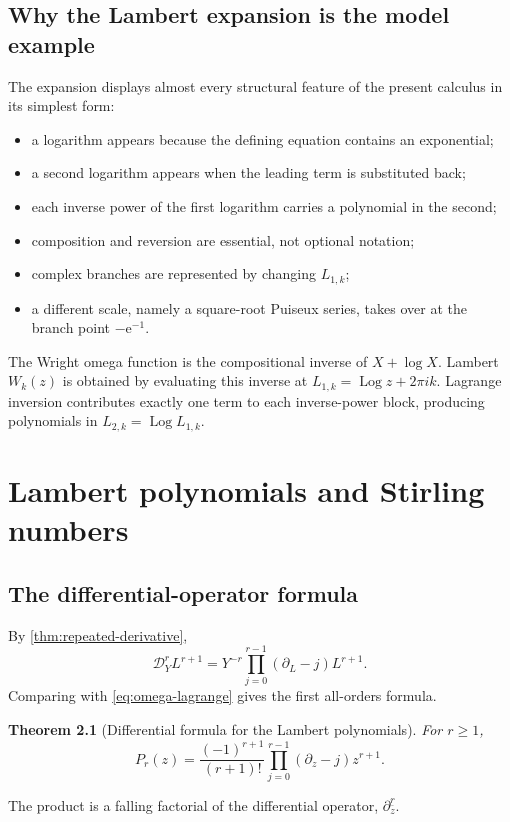 \documentclass[11pt,oneside]{book}
\newtheorem{theorem}{Theorem}[chapter]
\theoremstyle{definition}
\theoremstyle{remark}
\DeclareMathOperator{\Log}{Log}
\newcommand{\e}{\mathrm e}
\newcommand{\D}{\mathcal D}
\begin{document}
\section{Why the Lambert expansion is the model example}
The expansion displays almost every structural feature of the present
calculus in its simplest form:
\begin{itemize}
\item a logarithm appears because the defining equation contains an
      exponential;
\item a second logarithm appears when the leading term is substituted back;
\item each inverse power of the first logarithm carries a polynomial in the
      second;
\item composition and reversion are essential, not optional notation;
\item complex branches are represented by changing $L_{1,k}$;
\item a different scale, namely a square-root Puiseux series, takes over at
      the branch point $-\e^{-1}$.
\end{itemize}

\begin{summarybox}
The Wright omega function is the compositional inverse of $X+\log X$.
Lambert $W_k(z)$ is obtained by evaluating this inverse at
$L_{1,k}=\Log z+2\pi i k$.  Lagrange inversion contributes exactly one term
to each inverse-power block, producing polynomials in
$L_{2,k}=\Log L_{1,k}$.
\end{summarybox}


\chapter{Lambert polynomials and Stirling numbers}
\label{ch:lambert-polynomials}

\section{The differential-operator formula}
By \cref{thm:repeated-derivative},
\[
 \D_Y^r L^{r+1}
 =Y^{-r}\prod_{j=0}^{r-1}(\partial_L-j)L^{r+1}.
\]
Comparing with \eqref{eq:omega-lagrange} gives the first all-orders formula.

\begin{theorem}[Differential formula for the Lambert polynomials]
\label{thm:P-differential}
For $r\ge1$,
\begin{equation}\label{eq:P-differential}
 P_r(z)=\frac{(-1)^{r+1}}{(r+1)!}
 \prod_{j=0}^{r-1}(\partial_z-j)z^{r+1}.
\end{equation}
\end{theorem}
The product is a falling factorial of the differential operator,
$\partial_z^{\underline r}$.
\end{document}
